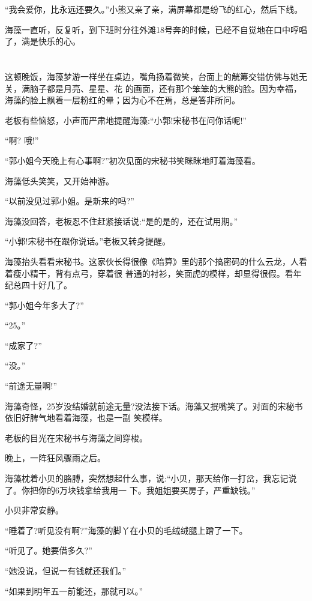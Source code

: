 \documentclass[11pt,a4paper,onecolumn]{article}
\begin{document}
``我会爱你，比永远还要久。''小熊又亲了亲，满屏幕都是纷飞的红心，然后下线。

海藻一直听，反复听，到下班时分往外滩18号奔的时候，已经不自觉地在口中哼唱了，满是快乐的心。

\section[\thesection]{}

这顿晚饭，海藻梦游一样坐在桌边，嘴角扬着微笑，台面上的觥筹交错仿佛与她无关，满脑子都是月亮、星星、花
的画面，还有那个笨笨的大熊的脸。因为幸福，海藻的脸上飘着一层粉红的晕；因为心不在焉，总是答非所问。

老板有些恼怒，小声而严肃地提醒海藻:``小郭!宋秘书在问你话呢!''

``啊? 哦!''

``郭小姐今天晚上有心事啊?''初次见面的宋秘书笑眯眯地盯着海藻看。

海藻低头笑笑，又开始神游。

``以前没见过郭小姐。是新来的吗?''

海藻没回答，老板忍不住赶紧接话说:``是的是的，还在试用期。''

``小郭!宋秘书在跟你说话。''老板又转身提醒。

海藻抬头看看宋秘书。这家伙长得很像《暗算》里的那个搞密码的什么云龙，人看着瘦小精干，背有点弓，穿着很
普通的衬衫，笑面虎的模样，却显得很假。看年纪总四十好几了。

``郭小姐今年多大了?''

``25。''

``成家了?''

``没。''

``前途无量啊!''

海藻奇怪，25岁没结婚就前途无量?没法接下话。海藻又抿嘴笑了。对面的宋秘书依旧好脾气地看着海藻，也是一副
笑模样。

老板的目光在宋秘书与海藻之间穿梭。

晚上，一阵狂风骤雨之后。

海藻枕着小贝的胳膊，突然想起什么事，说:``小贝，那天给你一打岔，我忘记说了。你把你的6万块钱拿给我用一
下。我姐姐要买房子，严重缺钱。''

小贝非常安静。

``睡着了?听见没有啊?''海藻的脚丫在小贝的毛绒绒腿上蹭了一下。

``听见了。她要借多久?''

``她没说，但说一有钱就还我们。''

``如果到明年五一前能还，那就可以。''
\end{document}
